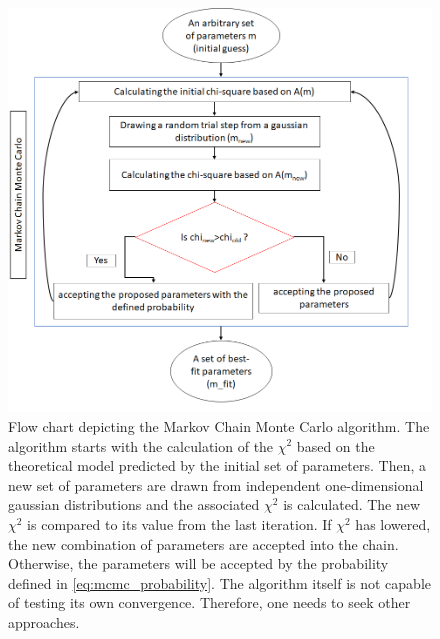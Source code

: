 \documentclass[12pt, TexShade, letterpaper]{report}
\begin{document}
\begin{figure}[h!]
\centering
\includegraphics[scale =0.9]{MCMC_flow.png}
\caption[Flow chart of MCMC]{Flow chart depicting the Markov Chain Monte Carlo algorithm. The algorithm starts with the calculation of the $\chi^2$ based on the theoretical model predicted by the initial set of parameters. Then, a new set of parameters are drawn from independent one-dimensional gaussian distributions and the associated $\chi^2$ is calculated. The new $\chi^2$ is compared to its value from the last iteration. If $\chi^2$ has lowered, the new combination of parameters are accepted into the chain. Otherwise, the parameters will be accepted by the probability defined in \ref{eq:mcmc_probability}. The algorithm itself is not capable of testing its own convergence. Therefore, one needs to seek other approaches.}
\label{fig:MCMC_flow}
\end{figure}
\end{document}
